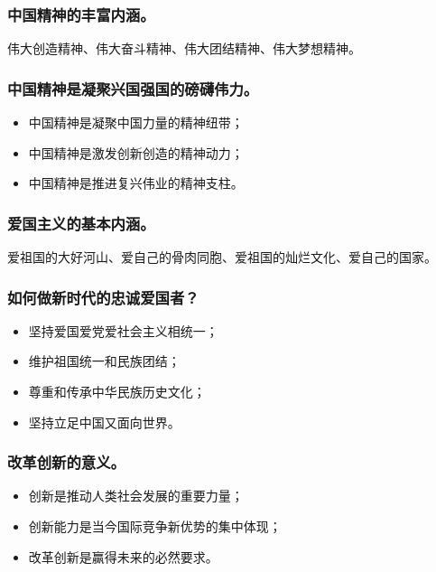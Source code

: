 \documentclass{article}
\begin{document}
\subsubsection{中国精神的丰富内涵。}
伟大创造精神、伟大奋斗精神、伟大团结精神、伟大梦想精神。

\subsubsection{中国精神是凝聚兴国强国的磅礴伟力。}
\begin{itemize}
    \item 中国精神是凝聚中国力量的精神纽带；
    \item 中国精神是激发创新创造的精神动力；
    \item 中国精神是推进复兴伟业的精神支柱。
\end{itemize}

\subsubsection{爱国主义的基本内涵。}
爱祖国的大好河山、爱自己的骨肉同胞、爱祖国的灿烂文化、爱自己的国家。

\subsubsection{如何做新时代的忠诚爱国者？}
\begin{itemize}
    \item 坚持爱国爱党爱社会主义相统一；
    \item 维护祖国统一和民族团结；
    \item 尊重和传承中华民族历史文化；
    \item 坚持立足中国又面向世界。
\end{itemize}

\subsubsection{改革创新的意义。}
\begin{itemize}
    \item 创新是推动人类社会发展的重要力量；
    \item 创新能力是当今国际竞争新优势的集中体现；
    \item 改革创新是赢得未来的必然要求。
\end{itemize}
\end{document}
